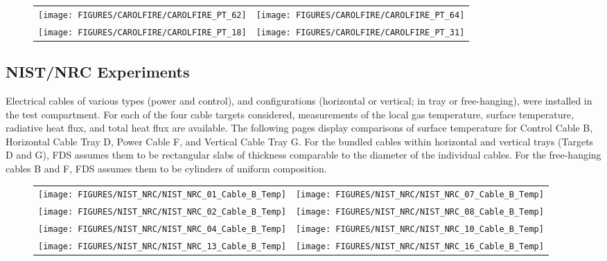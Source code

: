 \begin{figure}[p]
\begin{tabular*}{\textwidth}{l@{\extracolsep{\fill}}r}
\texttt{[image: FIGURES/CAROLFIRE/CAROLFIRE\_PT\_62]} &
\texttt{[image: FIGURES/CAROLFIRE/CAROLFIRE\_PT\_64]} \\
\texttt{[image: FIGURES/CAROLFIRE/CAROLFIRE\_PT\_18]} &
\texttt{[image: FIGURES/CAROLFIRE/CAROLFIRE\_PT\_31]}
\end{tabular*}
\label{CAROLFIRE_Special_1}
\end{figure}


\clearpage

\subsection{NIST/NRC Experiments}

Electrical cables of various types (power and control), and configurations (horizontal or vertical; in tray or free-hanging), were installed in the test compartment. For each of the four cable targets considered, measurements of the local gas temperature, surface temperature, radiative heat flux, and total heat flux are available.  The following pages display comparisons of surface temperature for Control Cable B, Horizontal Cable Tray D, Power Cable F, and Vertical Cable Tray G. For the bundled cables within horizontal and vertical trays (Targets D and G), FDS assumes them to be rectangular slabs of thickness comparable to the diameter of the individual cables. For the free-hanging cables B and F, FDS assumes them to be cylinders of uniform composition.

\newpage

\begin{figure}[p]
\begin{tabular*}{\textwidth}{l@{\extracolsep{\fill}}r}
\texttt{[image: FIGURES/NIST\_NRC/NIST\_NRC\_01\_Cable\_B\_Temp]} &
\texttt{[image: FIGURES/NIST\_NRC/NIST\_NRC\_07\_Cable\_B\_Temp]} \\
\texttt{[image: FIGURES/NIST\_NRC/NIST\_NRC\_02\_Cable\_B\_Temp]} &
\texttt{[image: FIGURES/NIST\_NRC/NIST\_NRC\_08\_Cable\_B\_Temp]} \\
\texttt{[image: FIGURES/NIST\_NRC/NIST\_NRC\_04\_Cable\_B\_Temp]} &
\texttt{[image: FIGURES/NIST\_NRC/NIST\_NRC\_10\_Cable\_B\_Temp]} \\
\texttt{[image: FIGURES/NIST\_NRC/NIST\_NRC\_13\_Cable\_B\_Temp]} &
\texttt{[image: FIGURES/NIST\_NRC/NIST\_NRC\_16\_Cable\_B\_Temp]}
\end{tabular*}
\label{NIST_NRC_Cable_B_Closed}
\end{figure}

